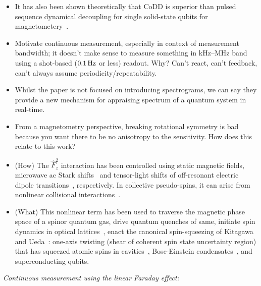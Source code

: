 \documentclass[aps,prl,reprint,superscriptaddress,floatfix]{revtex4-1}
\begin{document}
\begin{itemize}
    \item It has also been shown theoretically that CoDD is superior than pulsed sequence dynamical decoupling for single solid-state qubits for magnetometery~\cite{hirose_continuous_2012}.
    \item[\checkmark] Motivate continuous measurement, especially in context of measurement bandwidth; it doesn't make sense to measure something in kHz--MHz band using a shot-based ($\unit[0.1]{Hz}$ or less) readout. Why? Can't react, can't feedback, can't always assume periodicity/repeatability.
    \item Whilst the paper is not focused on introducing spectrograms, we can say they provide a new mechanism for appraising spectrum of a quantum system in real-time. 
    \item From a magnetometry perspective, breaking rotational symmetry is bad because you want there to be no anisotropy to the sensitivity. How does this relate to this work?
    \item[\checkmark] (How) The $\hat{F}_z^2$ interaction has been controlled using static magnetic fields, microwave ac Stark shifts~\cite{gerbier_resonant_2006} and tensor-light shifts of off-resonant electric dipole transitions~\cite{smith_continuous_2004}, respectively.
    In collective pseudo-spins, it can arise from nonlinear collisional interactions~\cite{riedel_atom-chip-based_2010,*gross_nonlinear_2010}.
    \item (What) This nonlinear term has been used to traverse the magnetic phase space of a spinor quantum gas, drive quantum quenches of same, initiate spin dynamics in optical lattices~\cite{gerbier_resonant_2006}, enact the canonical spin-squeezing of Kitagawa and Ueda~\cite{kitagawa_squeezed_1993}: one-axis twisting (shear of coherent spin state uncertainty region) that has squeezed atomic spins in cavities~\cite{leroux_implementation_2010}, Bose-Einstein condensates~\cite{riedel_atom-chip-based_2010,*gross_nonlinear_2010}, and superconducting qubits.
\end{itemize}
\textit{Continuous measurement using the linear Faraday effect:}
\end{document}
